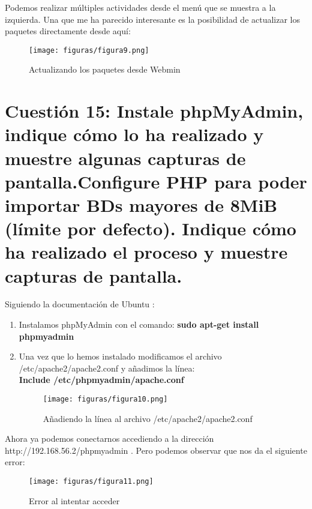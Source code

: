 Podemos realizar múltiples actividades desde el menú que se muestra a la izquierda. Una que me ha parecido interesante es la posibilidad de actualizar los paquetes directamente desde aquí:
\begin{figure}[H] %
	\centering
	\texttt{[image: figuras/figura9.png]}  %
	\label{figura9}
	
	\caption{Actualizando los paquetes desde Webmin} 
\end{figure}

\section{Cuestión 15: Instale phpMyAdmin, indique cómo lo ha realizado y muestre algunas capturas de pantalla.Configure PHP para poder importar BDs mayores de 8MiB (límite por defecto). Indique cómo ha realizado el proceso y muestre capturas de pantalla.}
\label{cuestion15}
Siguiendo la documentación de Ubuntu \cite{phpmyadmin}:
\begin{enumerate}
	\item Instalamos phpMyAdmin con el comando: \textbf{sudo apt-get install phpmyadmin}
	\item Una vez que lo hemos instalado modificamos el archivo /etc/apache2/apache2.conf y añadimos la línea:\\
	\textbf{Include /etc/phpmyadmin/apache.conf}\\
	\begin{figure}[H] %
		\centering
		\texttt{[image: figuras/figura10.png]}  %
		\label{figura10}
		
		\caption{Añadiendo la línea al archivo /etc/apache2/apache2.conf} 
	\end{figure}
\end{enumerate}
Ahora ya podemos conectarnos accediendo a la dirección http://192.168.56.2/phpmyadmin . Pero podemos observar que nos da el siguiente error:
\begin{figure}[H] %
	\centering
	\texttt{[image: figuras/figura11.png]}  %
	\label{figura11}
	
	\caption{Error al intentar acceder} 
\end{figure}
